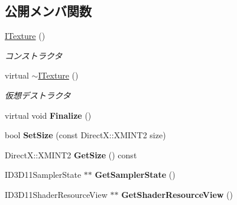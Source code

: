 \subsection*{公開メンバ関数}
\begin{DoxyCompactItemize}
\item 
\hyperlink{class_a_p_i_1_1abstract_a296b1719c68831928574193a56a32791}{I\+Texture} ()\hypertarget{class_a_p_i_1_1abstract_a296b1719c68831928574193a56a32791}{}\label{class_a_p_i_1_1abstract_a296b1719c68831928574193a56a32791}

\begin{DoxyCompactList}\small\item\em コンストラクタ \end{DoxyCompactList}\item 
virtual \hyperlink{class_a_p_i_1_1abstract_a79a99935966ece5dbbd8be4439da47dd}{$\sim$\+I\+Texture} ()\hypertarget{class_a_p_i_1_1abstract_a79a99935966ece5dbbd8be4439da47dd}{}\label{class_a_p_i_1_1abstract_a79a99935966ece5dbbd8be4439da47dd}

\begin{DoxyCompactList}\small\item\em 仮想デストラクタ \end{DoxyCompactList}\item 
virtual void {\bfseries Finalize} ()\hypertarget{class_a_p_i_1_1abstract_a5659cae021514f6919def4b7f67402cf}{}\label{class_a_p_i_1_1abstract_a5659cae021514f6919def4b7f67402cf}

\item 
bool {\bfseries Set\+Size} (const Direct\+X\+::\+X\+M\+I\+N\+T2 size)\hypertarget{class_a_p_i_1_1abstract_ac3e510a817d37307e790d4d414e956b5}{}\label{class_a_p_i_1_1abstract_ac3e510a817d37307e790d4d414e956b5}

\item 
Direct\+X\+::\+X\+M\+I\+N\+T2 {\bfseries Get\+Size} () const \hypertarget{class_a_p_i_1_1abstract_a2e070ca1e8dfcf0404a2922dc1cd0bd6}{}\label{class_a_p_i_1_1abstract_a2e070ca1e8dfcf0404a2922dc1cd0bd6}

\item 
I\+D3\+D11\+Sampler\+State $\ast$$\ast$ {\bfseries Get\+Sampler\+State} ()\hypertarget{class_a_p_i_1_1abstract_adb362e0200295c54533c2491817ee356}{}\label{class_a_p_i_1_1abstract_adb362e0200295c54533c2491817ee356}

\item 
I\+D3\+D11\+Shader\+Resource\+View $\ast$$\ast$ {\bfseries Get\+Shader\+Resource\+View} ()\hypertarget{class_a_p_i_1_1abstract_ad03203b23b31f1b5c3dad3bdf9f979c3}{}\label{class_a_p_i_1_1abstract_ad03203b23b31f1b5c3dad3bdf9f979c3}


\end{DoxyCompactItemize}
